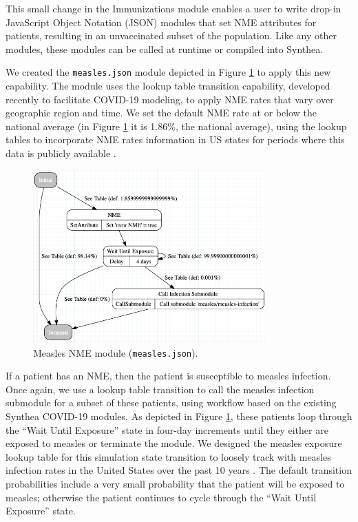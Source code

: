 \documentclass[12pt]{article}
\begin{document}
This small change in the Immunizations module enables a user to write drop-in JavaScript Object Notation (JSON) modules that set NME attributes for patients, resulting in an unvaccinated subset of the population.  Like any other modules, these modules can be called at runtime or compiled into Synthea.  

We created the \texttt{measles.json} module depicted in Figure \ref{fig: measles.json} \cite{synthea-module-builder} to apply this new capability.  The module uses the lookup table transition capability, developed recently to facilitate COVID-19 modeling, to apply NME rates that vary over geographic region and time.  We set the default NME rate at or below the national average (in Figure \ref{fig: measles.json} it is 1.86\%, the national average), using the lookup tables to incorporate NME rates information in US states for periods where this data is publicly available \cite{vaccine-exemptions-cdc}.

\begin{figure}[!hbt]\centering
    \includegraphics[width=0.8\textwidth]{figures/measles_json.png}
    \caption{Measles NME module (\texttt{measles.json}). \label{fig: measles.json}}
\end{figure}

If a patient has an NME, then the patient is susceptible to measles infection.  Once again, we use a lookup table transition to call the measles infection submodule for a subset of these patients, using workflow based on the existing Synthea COVID-19 modules.  As depicted in Figure \ref{fig: measles.json}, these patients loop through the ``Wait Until Exposure'' state in four-day increments until they either are exposed to measles or terminate the module.  We designed the measles exposure lookup table for this simulation state transition to loosely track with measles infection rates in the United States over the past 10 years \cite{measles-cases-cdc}.  The default transition probabilities include a very small probability that the patient will be exposed to measles; otherwise the patient continues to cycle through the ``Wait Until Exposure'' state.  
\end{document}
